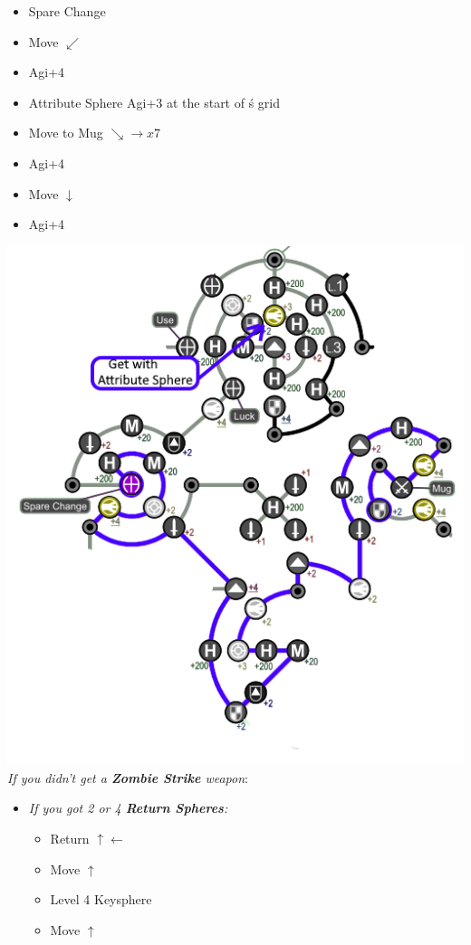 \begin{spheregrid}
\begin{multicols}{2}
\begin{itemize}
                    \begin{itemize}
    	\item Spare Change
    	\item Move $\swarrow$
    	\item Agi+4
    	\item Attribute Sphere Agi+3 at the start of \rikku\'s grid
    	\item Move to Mug $\searrow\rightarrow x7$
    	\item Agi+4
    	\item Move $\downarrow$
    	\item Agi+4
                    \end{itemize}
                    \includegraphics[width=.8\columnwidth]{graphics/0_return_before_BFA}
                    \columnbreak
                    \tidusf \textit{If you didn't get a \textbf{Zombie Strike} weapon}:
                    \begin{itemize}
                    	\item \textit{If you got 2 or 4 \textbf{Return Spheres}:}
                    	\begin{itemize}
                    	\item Return $\uparrow\leftarrow$
                    	\item Move $\uparrow$
                    	\item Level 4 Keysphere
                    	\item Move $\uparrow$

\end{itemize}
\end{itemize}
\end{itemize}
\end{multicols}
\end{spheregrid}
